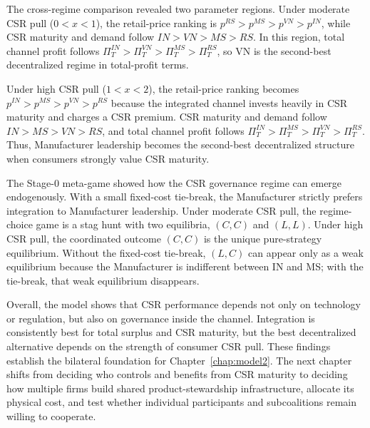 The cross-regime comparison revealed two parameter regions. Under moderate CSR pull ($0<x<1$), the retail-price ranking is $p^{RS}>p^{MS}>p^{VN}>p^{IN}$, while CSR maturity and demand follow $IN>VN>MS>RS$. In this region, total channel profit follows $\Pi_T^{IN}>\Pi_T^{VN}>\Pi_T^{MS}>\Pi_T^{RS}$, so VN is the second-best decentralized regime in total-profit terms.

Under high CSR pull ($1<x<2$), the retail-price ranking becomes $p^{IN}>p^{MS}>p^{VN}>p^{RS}$ because the integrated channel invests heavily in CSR maturity and charges a CSR premium. CSR maturity and demand follow $IN>MS>VN>RS$, and total channel profit follows $\Pi_T^{IN}>\Pi_T^{MS}>\Pi_T^{VN}>\Pi_T^{RS}$. Thus, Manufacturer leadership becomes the second-best decentralized structure when consumers strongly value CSR maturity.

The Stage-0 meta-game showed how the CSR governance regime can emerge endogenously. With a small fixed-cost tie-break, the Manufacturer strictly prefers integration to Manufacturer leadership. Under moderate CSR pull, the regime-choice game is a stag hunt with two equilibria, $(C,C)$ and $(L,L)$. Under high CSR pull, the coordinated outcome $(C,C)$ is the unique pure-strategy equilibrium. Without the fixed-cost tie-break, $(L,C)$ can appear only as a weak equilibrium because the Manufacturer is indifferent between IN and MS; with the tie-break, that weak equilibrium disappears.

Overall, the model shows that CSR performance depends not only on technology or regulation, but also on governance inside the channel. Integration is consistently best for total surplus and CSR maturity, but the best decentralized alternative depends on the strength of consumer CSR pull. These findings establish the bilateral foundation for Chapter~\ref{chap:model2}. The next chapter shifts from deciding who controls and benefits from CSR maturity to deciding how multiple firms build shared product-stewardship infrastructure, allocate its physical cost, and test whether individual participants and subcoalitions remain willing to cooperate.

